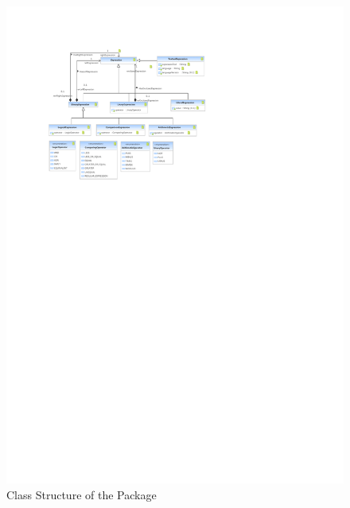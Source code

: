 %
%

\begin{figure}[htb]
  \centering
  \includegraphics[width=\textwidth]{figures/A_technical-reference/packages/core_expressions_common/core-expressions-common}
  \caption{Class Structure of the  Package}
  \label{fig:MM:expressions::common}
\end{figure}
